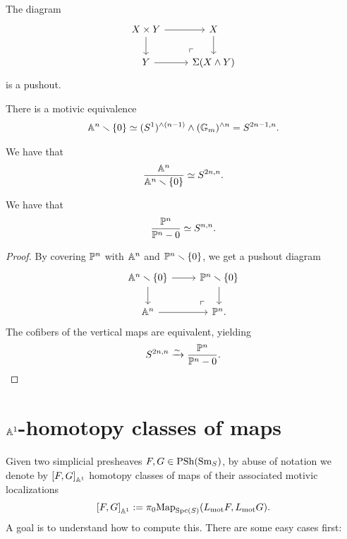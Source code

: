 \documentclass[11pt]{amsart}
\let\smashprod\wedge
\begin{document}
\begin{exercise} The diagram
\[ \begin{tikzcd}
    X \times Y\rar\dar & X\dar\\
    Y\rar & \Sigma(X \smashprod Y)\po
\end{tikzcd} \]
is a pushout.
\end{exercise}

\begin{proposition} There is a motivic equivalence
\begin{align*}
    \A^n \minus \{0\} \simeq (S^1)^{\smashprod (n-1)} \smashprod (\mathbb{G}_m)^{\smashprod  n} = S^{2n-1,n}.
\end{align*}
\end{proposition}

\begin{corollary} We have that
\begin{align*}
    \frac{\A^n}{\A^n\minus\{0\}} \simeq S^{2n,n}.
\end{align*}
\end{corollary}


\begin{proposition} We have that
\begin{align*}
    \frac{\P^n}{\P^n-0}\simeq S^{n,n}.
\end{align*}
\end{proposition}
\begin{proof} By covering $\P^n$ with $\A^n$ and $\P^n\minus\left\{ 0 \right\}$, we get a pushout diagram
\[ \begin{tikzcd}
    \A^n\minus \left\{ 0 \right\}\rar\dar & \P^n\minus\left\{ 0 \right\}\dar\\
    \A^n\rar & \P^n.\po
\end{tikzcd} \]
The cofibers of the vertical maps are equivalent, yielding
\begin{align*}
    S^{2n,n} \xto{\sim} \frac{\P^n}{\P^n-0}.
\end{align*}
\end{proof}



\section{$\A^1$-homotopy classes of maps}

Given two simplicial presheaves $F,G \in \PSh(\Sm_S)$, by abuse of notation we denote by $\left[ F,G \right]_{\A^1}$ homotopy classes of maps of their associated motivic localizations
\begin{align*}
    \left[ F,G \right]_{\A^1} := \pi_0 \Map_{\Spc(S)} (L_\mot F, L_\mot G).
\end{align*}
%
A goal is to understand how to compute this. There are some easy cases first:
\end{document}

